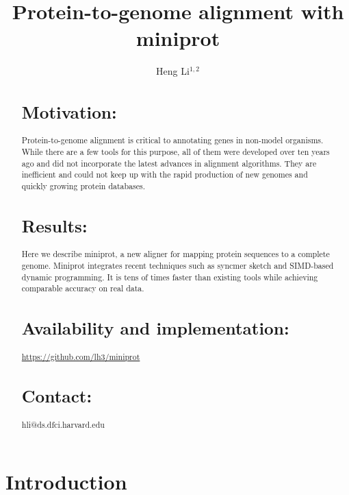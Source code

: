 \documentclass{bioinfo}
\begin{document}

\title[Aligning proteins to genomes with miniprot]{Protein-to-genome alignment with miniprot}
\author[Li]{Heng Li$^{1,2}$}
\address{$^1$Dana-Farber Cancer Institute, 450 Brookline Ave, Boston, MA 02215, USA,
$^2$Harvard Medical School, 10 Shattuck St, Boston, MA 02215, USA}

\maketitle

\begin{abstract}

\section{Motivation:} Protein-to-genome alignment is critical to annotating
genes in non-model organisms. While there are a few tools for this purpose, all
of them were developed over ten years ago and did not incorporate the latest
advances in alignment algorithms. They are inefficient and could not keep up
with the rapid production of new genomes and quickly growing protein databases.

\section{Results:} Here we describe miniprot, a new aligner for mapping
protein sequences to a complete genome. Miniprot integrates recent techniques
such as syncmer sketch and SIMD-based dynamic programming. It is tens of times
faster than existing tools while achieving comparable accuracy on real data.

\section{Availability and implementation:}
\href{https://github.com/lh3/miniprot}{https://github.com/lh3/miniprot}

\section{Contact:} hli@ds.dfci.harvard.edu
\end{abstract}

\section{Introduction}
\end{document}
